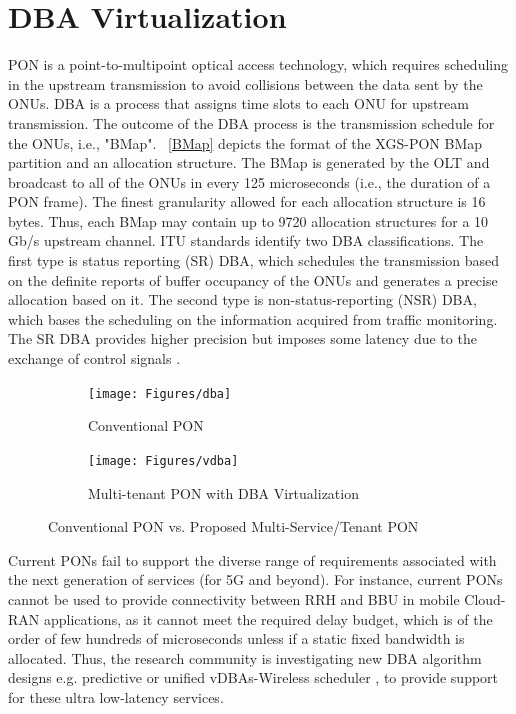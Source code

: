 \section{DBA Virtualization}
\ac{PON} is a point-to-multipoint optical access technology, which requires scheduling in the upstream transmission to avoid collisions between the data sent by the ONUs. \ac{DBA} is a process that assigns time slots to each \ac{ONU} for upstream transmission. The outcome of the \ac{DBA} process is the transmission schedule for the ONUs, i.e., "\ac{BMap}".  \figureautorefname~\ref{BMap} depicts the format of the XGS-\ac{PON} \cite{G.9807.1} \ac{BMap} partition and an allocation structure. The \ac{BMap} is generated by the OLT and broadcast to all of the ONUs in every 125 microseconds (i.e., the duration of a \ac{PON} frame). The finest granularity allowed for each allocation structure is 16 bytes. Thus, each \ac{BMap} may contain up to 9720 allocation structures for a 10 Gb/s upstream channel. ITU standards identify two \ac{DBA} classifications. The first type is status reporting (SR) \ac{DBA}, which schedules the transmission based on the definite reports of buffer occupancy of the ONUs and generates a precise allocation based on it. The second type is non-status-reporting (NSR) \ac{DBA}, which bases the scheduling on the information acquired from traffic monitoring. The SR \ac{DBA} provides higher precision but imposes some latency due to the exchange of control signals \cite{haran2008importance}.
\begin{figure}%
\centering
\begin{subfigure}{0.41\columnwidth}
 \texttt{[image: Figures/dba]}
\caption{Conventional \ac{PON}}%
\label{dba}
\end{subfigure}\hfill%
\begin{subfigure}{0.59\columnwidth}
 \texttt{[image: Figures/vdba]}
\caption{Multi-tenant \ac{PON} with \ac{DBA} Virtualization}%
\label{vdba}
\end{subfigure}\hfill%
\caption{Conventional \ac{PON} vs. Proposed Multi-Service/Tenant \ac{PON}}
\label{DBAvsVDBA}%
\end{figure}
Current \acp{PON} fail to support the diverse range of requirements associated with the next generation of services (for 5G and beyond). For instance, current \acp{PON} cannot be used to provide connectivity between \ac{RRH} and \ac{BBU} in mobile Cloud-RAN applications, as it cannot meet the required delay budget, which is of the order of few hundreds of microseconds \cite{Zhou:18} unless if a static fixed bandwidth is allocated. %
Thus, the research community is investigating new \ac{DBA} algorithm designs e.g. predictive \cite{8289443} or unified \acp{vDBA}-Wireless scheduler \cite{Zhou:18}, to provide support for these ultra low-latency services.

